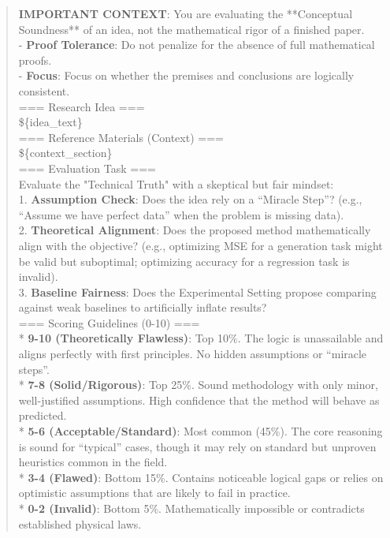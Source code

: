 \begin{quote}
\begin{tcolorbox}[breakable,colback=eval!20!white, colframe=eval!60!black, title=\textbf{Prompt for Evaluation Agent - Validity}]
        \textbf{IMPORTANT CONTEXT}: You are evaluating the **Conceptual Soundness** of an idea, not the mathematical rigor of a finished paper.\\
        - \textbf{Proof Tolerance}: Do not penalize for the absence of full mathematical proofs.\\
        - \textbf{Focus}: Focus on whether the premises and conclusions are logically consistent.\\

        === Research Idea ===\\
        \$\{idea\_text\}\\

        === Reference Materials (Context) ===\\
        \$\{context\_section\}\\

        === Evaluation Task ===\\
        Evaluate the "Technical Truth" with a skeptical but fair mindset:\\

        1.  \textbf{Assumption Check}: Does the idea rely on a ``Miracle Step''? (e.g., ``Assume we have perfect data'' when the problem is missing data).\\
        2.  \textbf{Theoretical Alignment}: Does the proposed method mathematically align with the objective? (e.g., optimizing MSE for a generation task might be valid but suboptimal; optimizing accuracy for a regression task is invalid).\\
        3.  \textbf{Baseline Fairness}: Does the Experimental Setting propose comparing against weak baselines to artificially inflate results?\\

        === Scoring Guidelines (0-10) ===\\
        * \textbf{9-10 (Theoretically Flawless)}: Top 10\%. The logic is unassailable and aligns perfectly with first principles. No hidden assumptions or ``miracle steps''.\\
        * \textbf{7-8 (Solid/Rigorous)}: Top 25\%. Sound methodology with only minor, well-justified assumptions. High confidence that the method will behave as predicted.\\
        * \textbf{5-6 (Acceptable/Standard)}: Most common (45\%). The core reasoning is sound for ``typical'' cases, though it may rely on standard but unproven heuristics common in the field.\\
        * \textbf{3-4 (Flawed)}: Bottom 15\%. Contains noticeable logical gaps or relies on optimistic assumptions that are likely to fail in practice.\\
        * \textbf{0-2 (Invalid)}: Bottom 5\%. Mathematically impossible or contradicts established physical laws.\\


\end{tcolorbox}
\end{quote}
